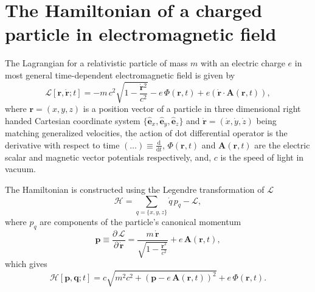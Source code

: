 \documentclass[]{article}
\title{}
\author{}
\begin{document}
\maketitle

\begin{abstract}

\end{abstract}


\newpage
\section{The Hamiltonian of a charged particle in electromagnetic field}


The Lagrangian for a relativistic particle of mass $m$ with an electric charge $e$
in most general time-dependent electromagnetic field is given by
\[
	\mathcal{L}[\mathbf{r},\dot{\mathbf{r}};t] =
	-m\,c^2 \sqrt{1-\frac{\dot{\mathbf{r}}{}^2}{c^2}}
	-e\,\Phi(\mathbf{r},t)
	+e\left( \dot{\mathbf{r}} \cdot \mathbf{A}(\mathbf{r},t) \right),
\]
where $\mathbf{r}=(x,y,z)$ is a position vector of a particle in three dimensional
right handed Cartesian coordinate system
$\{\hat{\mathbf{e}}_x,\hat{\mathbf{e}}_y,\hat{\mathbf{e}}_z\}$
and $\dot{\mathbf{r}}=(\dot{x},\dot{y},\dot{z})$ being matching generalized
velocities, the action of dot differential operator is the derivative with respect to time $\dot{(\ldots)}\equiv\frac{\mathrm{d}}{\mathrm{d}t}$,
$\Phi(\mathbf{r},t)$ and $\mathbf{A}(\mathbf{r},t)$ are the electric scalar and
magnetic vector potentials respectively, and, $c$ is the speed of light in vacuum.

The Hamiltonian is constructed using the Legendre transformation of
$\mathcal{L}$
\[
	\mathcal{H} = \sum_{q=\{x,y,z\}} \dot{q}\, p_q - \mathcal{L},
\]
where $p_q$ are components of the particle's canonical momentum
\[
	\mathbf{p} \equiv \frac{\partial\,\mathcal{L}}{\partial\,\dot{\mathbf{r}}} =
		\frac{ m\,\dot{\mathbf{r}} }
			 { \sqrt{1-\frac{\dot{\mathbf{r}}^2}{c^2}} } +
		e\,\mathbf{A}(\mathbf{r},t),
\]
which gives
\[
	\mathcal{H}[\mathbf{p},\mathbf{q};t] =
	c \sqrt{ m^2c^2 + \left( \mathbf{p}-e\,\mathbf{A}(\mathbf{r},t) \right)^2 }
	+e\,\Phi(\mathbf{r},t).
\]

\newpage
\end{document}
